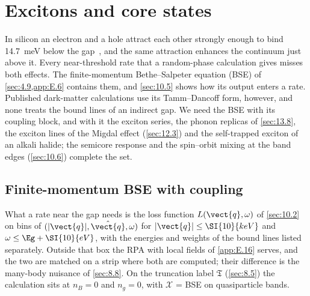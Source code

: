 \section{Excitons and core states}\label{app:E.15}

In silicon an electron and a hole attract each other strongly enough to bind \SI{14.7}{meV} below the gap~\cite{shaklee1970valley}, and the same attraction enhances the continuum just above it. Every near-threshold rate that a random-phase calculation gives misses both effects. The finite-momentum Bethe--Salpeter equation (BSE) of \cref{sec:4.9,app:E.6} contains them, and \cref{sec:10.5} shows how its output enters a rate. Published dark-matter calculations use its Tamm--Dancoff form, however, and none treats the bound lines of an indirect gap. We need the BSE with its coupling block, and with it the exciton series, the phonon replicas of \cref{sec:13.8}, the exciton lines of the Migdal effect (\cref{sec:12.3}) and the self-trapped exciton of an alkali halide; the semicore response and the spin--orbit mixing at the band edges (\cref{sec:10.6}) complete the set.

\subsection{Finite-momentum BSE with coupling}

What a rate near the gap needs is the loss function $L(\vect{q},\omega)$ of \cref{sec:10.2} on bins of $(|\vect{q}|,\hat{\vect{q}},\omega)$ for $|\vect{q}| \le \SI{10}{keV}$ and $\omega \le \Eg + \SI{10}{eV}$, with the energies and weights of the bound lines listed separately. Outside that box the RPA with local fields of \cref{app:E.16} serves, and the two are matched on a strip where both are computed; their difference is the many-body nuisance of \cref{sec:8.8}. On the truncation label $\mathfrak{T}$ (\cref{sec:8.5}) the calculation sits at $n_B = 0$ and $n_g = 0$, with $\mathcal{X}$ = BSE on quasiparticle bands.

